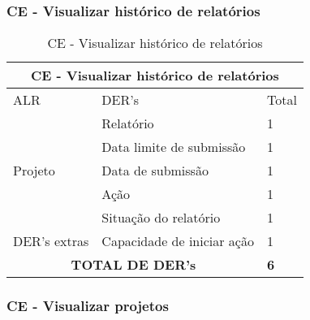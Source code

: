  \subsubsection{CE - Visualizar histórico de relatórios}
\begin{table}[!h]
\centering
\caption{CE - Visualizar histórico de relatórios}
\label{ce_visualizar_historico}
\begin{tabular}{|l|l|l|}
\multicolumn{3}{c}{CE - Visualizar histórico de relatórios}          \\ \hline
ALR                      & DER's                      & Total         \\ \hline
\multirow{5}{*}{Projeto} & Relatório                  & 1             \\\cline{2-3}
                         & Data limite de submissão   & 1             \\\cline{2-3}
                         & Data de submissão          & 1             \\\cline{2-3}
                         & Ação                       & 1             \\\cline{2-3}
                         & Situação do relatório      & 1             \\\hline
DER's extras             & Capacidade de iniciar ação & 1             \\\hline
\multicolumn{2}{|c|}{\textbf{TOTAL DE DER's}}                     & \textbf{6} \\ \hline
\end{tabular}
\end{table}


\vfill
\pagebreak
  \subsubsection{CE - Visualizar projetos}
  
